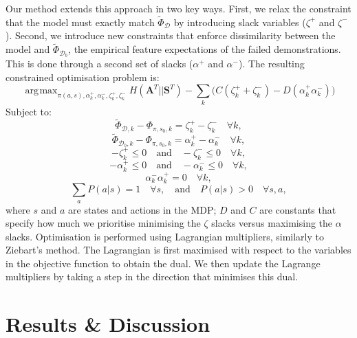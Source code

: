 \documentclass[conference]{IEEEtran}
\DeclareMathOperator*{\argmax}{\arg\!\max}
\begin{document}
Our method extends this approach in two key ways. First, we relax the constraint 
that the model must exactly match $\widetilde{\Phi}_{\mathcal{D}}$ by 
introducing slack variables ($\zeta^+$ and $\zeta^-$).  Second, we introduce new 
constraints that enforce dissimilarity between the model and 
$\widetilde{\Phi}_{\mathcal{D}_b}$, the empirical feature expectations of the 
failed demonstrations. This is done through a second set of slacks ($\alpha^+$ 
and $\alpha^-$). The resulting constrained optimisation problem is:
	\begin{equation*}
	\argmax_{\pi(a,s),\alpha^+_k ,\alpha^-_k ,\zeta^+_k, \zeta^-_k} H(\mathbf{A}^T||\mathbf{S}^T) - \sum_k\big(C(\zeta^+_k + \zeta^-_k)  -D(\alpha^+_k  \alpha^-_k)\big)
\end{equation*}
Subject to:
\begin{equation*}
  \widetilde{\Phi}_{\mathcal{D},k}-\Phi_{\pi,s_0,k}   = \zeta^+_k  - \zeta^-_k \quad \forall k, \label{eq:good_ineq}
\end{equation*}
\begin{equation*}
	\widetilde{\Phi}_{\mathcal{D}_b,k}-\Phi_{\pi,s_0,k}  = \alpha^+_k-\alpha^-_k \quad \forall k, \label{eq:bad_ineq}
\end{equation*}
\begin{equation*}
	-\zeta^+_k \leq 0 \quad \text{and} \quad -\zeta^-_k \leq 0 \quad \forall k,
\end{equation*}
\begin{equation*}
	-\alpha^+_k \leq 0 \quad \text{and} \quad -\alpha^-_k \leq 0 \quad \forall k,
\end{equation*}
\begin{equation*}
	\alpha^-_k \alpha^+_k = 0 \quad \forall k,  \label{eq:quadratic}
\end{equation*}
\begin{equation*}
\sum_aP(a|s)  = 1 \quad \forall s,   \quad \text{and} \quad P(a|s)  > 0 \quad \forall s,a,  
\end{equation*}
where $s$ and $a$ are states and actions in the MDP; $D$ and $C$ are constants that specify how much we prioritise minimising the $\zeta$ slacks versus maximising the $\alpha$ slacks. Optimisation is performed using Lagrangian multipliers, similarly to Ziebart's method. The Lagrangian is first maximised with respect to the variables in the objective function to obtain the dual. We then update the Lagrange multipliers by taking a step in the direction that minimises this dual.

\section{Results \& Discussion}
\end{document}
